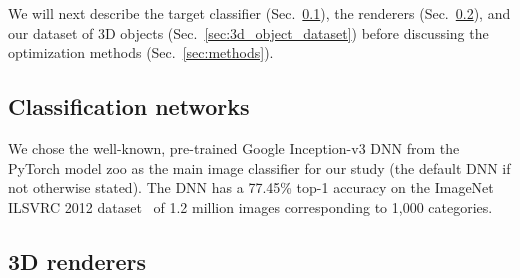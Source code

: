 \documentclass[10pt,twocolumn,letterpaper]{article}
\newcommand{\subsec}[1]{\noindent{\textbf{#1.}}}
\newcommand{\x}{\mathbf{x}}
\begin{document}
We will next describe the target classifier (Sec.~\ref{sec:target_dnn}), the renderers (Sec.~\ref{sec:renderers}), and our dataset of 3D objects (Sec.~\ref{sec:3d_object_dataset}) before discussing the optimization methods (Sec.~\ref{sec:methods}).



%

\subsection{Classification networks}
\label{sec:target_dnn}

We chose the well-known, pre-trained Google Inception-v3 \cite{Szegedy2015} DNN from the PyTorch model zoo \cite{torch2018vision} as the main image classifier for our study (the default DNN if not otherwise stated).
The DNN has a 77.45\% top-1 accuracy on the ImageNet ILSVRC 2012 dataset~\cite{russakovsky2015imagenet} of 1.2 million images corresponding to 1,000 categories.


\subsection{3D renderers}
\label{sec:renderers}
\end{document}
